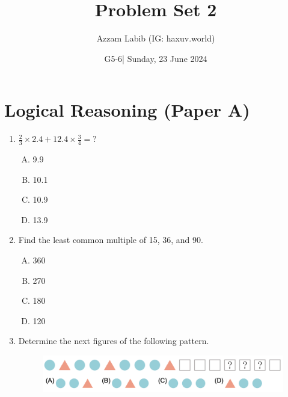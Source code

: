 \documentclass[11pt]{scrartcl}
\title{Problem Set 2}
\author{Azzam Labib (IG: haxuv.world)}
\date{G5-6| Sunday, 23 June 2024}
\begin{document}
\maketitle

\section{Logical Reasoning (Paper A)}
\begin{enumerate}
\item $\frac{2}{3} \times 2.4 + 12.4 \times \frac{3}{4} = ?$
\begin{enumerate}[(A)]
    \item 9.9 \item 10.1 \item 10.9 \item 13.9
\end{enumerate}

\item Find the least common multiple of 15, 36, and 90.
\begin{enumerate}[(A)]
    \item 360 \item 270 \item 180 \item 120
\end{enumerate}

\item Determine the next figures of the following pattern.
\begin{figure}[h]
    \centering
    \includegraphics[scale=0.7]{StarGen/0Figure/wmi-2020-6a-num3.png}
\end{figure}


\end{enumerate}
\end{document}
